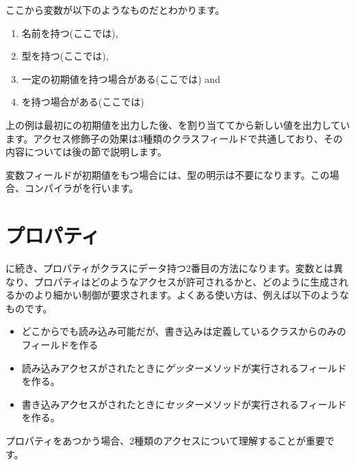 ここから変数が以下のようなものだとわかります。

\begin{enumerate}
	\item 名前を持つ(ここでは),
	\item 型を持つ(ここでは),
	\item 一定の初期値を持つ場合がある(ここでは) and
	\item {}を持つ場合がある(ここでは)
\end{enumerate}

上の例は最初にの初期値を出力した後、を割り当ててから新しい値を出力しています。アクセス修飾子の効果は3種類のクラスフィールドで共通しており、その内容については後の節で説明します。

変数フィールドが初期値をもつ場合には、型の明示は不要になります。この場合、コンパイラがを行います。




\section{プロパティ}
\label{class-field-property}

に続き、プロパティがクラスにデータ持つ2番目の方法になります。変数とは異なり、プロパティはどのようなアクセスが許可されるかと、どのように生成されるかのより細かい制御が要求されます。よくある使い方は、例えば以下のようなものです。

\begin{itemize}
	\item どこからでも読み込み可能だが、書き込みは定義しているクラスからのみのフィールドを作る
	\item 読み込みアクセスがされたときに\emph{ゲッター}メソッドが実行されるフィールドを作る。
	\item 書き込みアクセスがされたときに\emph{セッター}メソッドが実行されるフィールドを作る。
\end{itemize}

プロパティをあつかう場合、2種類のアクセスについて理解することが重要です。


